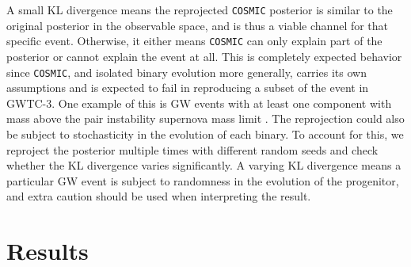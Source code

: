 \documentclass[twocolumn]{aastex631}
\begin{document}
\noindent A small KL divergence means the reprojected \texttt{COSMIC} posterior
is similar to the original posterior in the observable space, and is thus a
viable channel for that specific event. Otherwise, it either means
\texttt{COSMIC} can only explain part of the posterior or cannot explain the
event at all. This is completely expected behavior since \texttt{COSMIC}, and
isolated binary evolution more generally, carries its own assumptions and is
expected to fail in reproducing a subset of the event in GWTC-3. One example of
this is GW events with at least one component with mass above the pair
instability supernova mass limit \citep{Woosley2017, Farmer2020}. The
reprojection could also be subject to stochasticity in the evolution of each
binary. To account for this, we reproject the posterior multiple times with
different random seeds and check whether the KL divergence varies significantly.
A varying KL divergence means a particular GW event is subject to randomness in
the evolution of the progenitor, and extra caution should be used when
interpreting the result.


\section{Results}
\label{sec:result}
\end{document}
